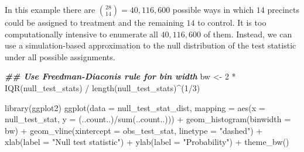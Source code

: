 \documentclass[
  12pt,
  leqno]{article}
\newenvironment{Shaded}{\begin{snugshade}}{\end{snugshade}}
\newcommand{\AttributeTok}[1]{\textcolor[rgb]{0.77,0.63,0.00}{#1}}
\newcommand{\DecValTok}[1]{\textcolor[rgb]{0.00,0.00,0.81}{#1}}
\newcommand{\DocumentationTok}[1]{\textcolor[rgb]{0.56,0.35,0.01}{\textbf{\textit{#1}}}}
\newcommand{\FunctionTok}[1]{\textcolor[rgb]{0.00,0.00,0.00}{#1}}
\newcommand{\NormalTok}[1]{#1}
\newcommand{\OtherTok}[1]{\textcolor[rgb]{0.56,0.35,0.01}{#1}}
\newcommand{\SpecialCharTok}[1]{\textcolor[rgb]{0.00,0.00,0.00}{#1}}
\newcommand{\StringTok}[1]{\textcolor[rgb]{0.31,0.60,0.02}{#1}}
\DeclareMathOperator{\1}{\mathbbm{1}}
\begin{document}
\normalsize

In this example there are \(\binom{28}{14} = 40,116,600\) possible ways
in which \(14\) precincts could be assigned to treatment and the
remaining \(14\) to control. It is too computationally intensive to
enumerate all \(40,116,600\) of them. Instead, we can use a
simulation-based approximation to the null distribution of the test
statistic under all possible assignments.

\scriptsize

\begin{Shaded}
\end{Shaded}

\normalsize

\scriptsize

\begin{Shaded}
\begin{Highlighting}[]
\DocumentationTok{\#\# Use Freedman{-}Diaconis rule for bin width}
\NormalTok{bw }\OtherTok{\textless{}{-}} \DecValTok{2} \SpecialCharTok{*} \FunctionTok{IQR}\NormalTok{(null\_test\_stats) }\SpecialCharTok{/} \FunctionTok{length}\NormalTok{(null\_test\_stats)}\SpecialCharTok{\^{}}\NormalTok{(}\DecValTok{1}\SpecialCharTok{/}\DecValTok{3}\NormalTok{)}

\FunctionTok{library}\NormalTok{(ggplot2)}
\FunctionTok{ggplot}\NormalTok{(}\AttributeTok{data =}\NormalTok{ null\_test\_stat\_dist,}
       \AttributeTok{mapping =} \FunctionTok{aes}\NormalTok{(}\AttributeTok{x =}\NormalTok{ null\_test\_stat, }\AttributeTok{y =}\NormalTok{ (..count..)}\SpecialCharTok{/}\FunctionTok{sum}\NormalTok{(..count..))) }\SpecialCharTok{+}
  \FunctionTok{geom\_histogram}\NormalTok{(}\AttributeTok{binwidth =}\NormalTok{ bw) }\SpecialCharTok{+}
  \FunctionTok{geom\_vline}\NormalTok{(}\AttributeTok{xintercept =}\NormalTok{ obs\_test\_stat,}
             \AttributeTok{linetype =} \StringTok{"dashed"}\NormalTok{) }\SpecialCharTok{+}
  \FunctionTok{xlab}\NormalTok{(}\AttributeTok{label =} \StringTok{"Null test statistic"}\NormalTok{) }\SpecialCharTok{+}
  \FunctionTok{ylab}\NormalTok{(}\AttributeTok{label =} \StringTok{"Probability"}\NormalTok{) }\SpecialCharTok{+}
  \FunctionTok{theme\_bw}\NormalTok{()}
\end{Highlighting}
\end{Shaded}
\end{document}
